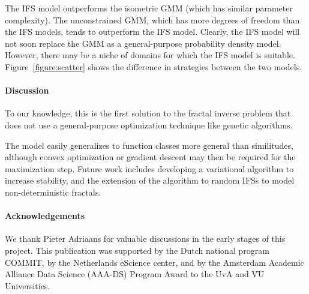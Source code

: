 \documentclass[reprint,amsmath,amssymb,aps,prl]{revtex4-1}
\begin{document}
The IFS model outperforms the isometric GMM (which has similar parameter complexity). The unconstrained GMM, which has more degrees of freedom than the IFS models, tends to outperform the IFS model. Clearly, the IFS model will not soon replace the GMM as a general-purpose probability density model. However, there may be a niche of domains for which the IFS model is suitable. Figure~\ref{figure:scatter} shows the difference in strategies between the two models.  

\paragraph{Discussion}
\label{section:discussion}

To our knowledge, this is the first solution to the fractal inverse problem that does not use a general-purpose optimization technique like genetic algorithms. 

The model easily generalizes to function classes more general than similitudes, although convex optimization or gradient descent may then be required for the maximization step. Future work includes developing a variational algorithm \cite{beal2003variational} to increase stability, and the extension of the algorithm to random IFSs \cite{hart1996fractal} to model non-deterministic fractals.

\paragraph{Acknowledgements} We thank Pieter Adriaans for valuable discussions in the early stages of this project. This publication was supported by the Dutch national program COMMIT, by the Netherlands eScience center, and by the Amsterdam Academic Alliance Data Science (AAA-DS) Program Award to the UvA and VU Universities.


\end{document}

